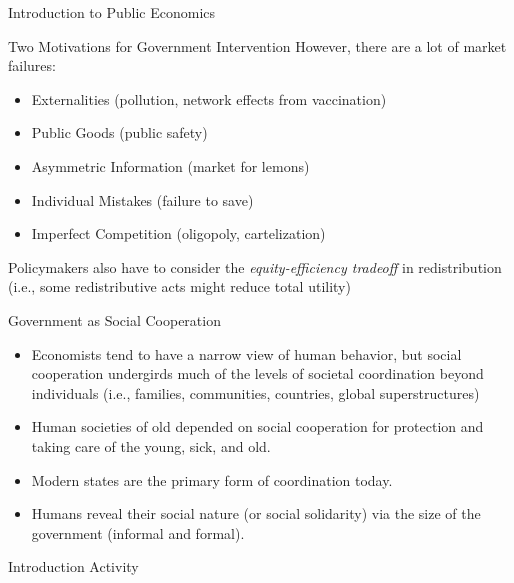 \documentclass[8pt]{extarticle}
\begin{document}
\begin{problem}{Introduction to Public Economics}
\begin{problem}{Two Motivations for Government Intervention}
      However, there are a lot of market failures:
      \begin{itemize}
        \item Externalities (pollution, network effects from vaccination)
        \item Public Goods (public safety)
        \item Asymmetric Information (market for lemons)
        \item Individual Mistakes (failure to save)
        \item Imperfect Competition (oligopoly, cartelization)
      \end{itemize}
      Policymakers also have to consider the \textit{equity-efficiency tradeoff} in redistribution (i.e., some redistributive acts might reduce total utility)
    \end{problem}
    \begin{problem}{Government as Social Cooperation}
      \begin{itemize}
        \item Economists tend to have a narrow view of human behavior, but social cooperation undergirds much of the levels of societal coordination beyond individuals (i.e., families, communities, countries, global superstructures)
        \item Human societies of old depended on social cooperation for protection and taking care of the young, sick, and old.
        \item Modern states are the primary form of coordination today.
        \item Humans reveal their social nature (or social solidarity) via the size of the government (informal and formal).
      \end{itemize}
    \end{problem}
  \end{problem}
  \begin{problem}{Introduction Activity}
    \begin{tcbraster}[raster columns = 1,colframe = black!75!white,colback=white]
    \end{tcbraster}
  \end{problem}
\end{document}
